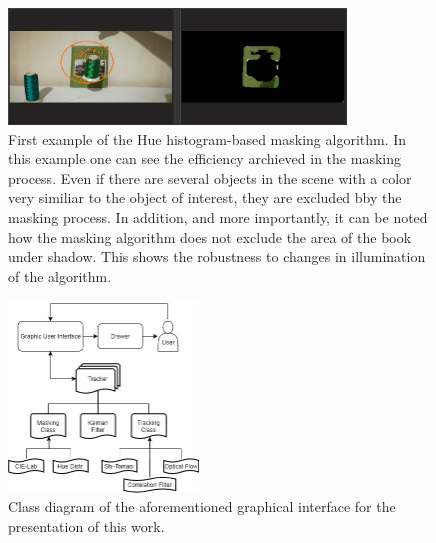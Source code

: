 \begin{figure}
\centering
	\includegraphics[width=0.8\textwidth]{Imagenes/camshift_mask1.png}
	\caption{First example of the Hue histogram-based masking algorithm. In this example one can see the efficiency archieved in the masking process. Even if there are several objects in the scene with a color very similiar to the object of interest, they are excluded bby the masking process. In addition, and more importantly, it can be noted how the masking algorithm does not exclude the area of the book under shadow. This shows the robustness to changes in illumination of the algorithm.}
	\label{fig:c_mask1}
\end{figure}

\begin{figure}[H]
	\centering
	\includegraphics[width=0.45\textwidth]{Imagenes/Classes.jpg}
	\caption{Class diagram of the aforementioned graphical interface for the presentation of this work.}
	\label{fig:class}
\end{figure}




















